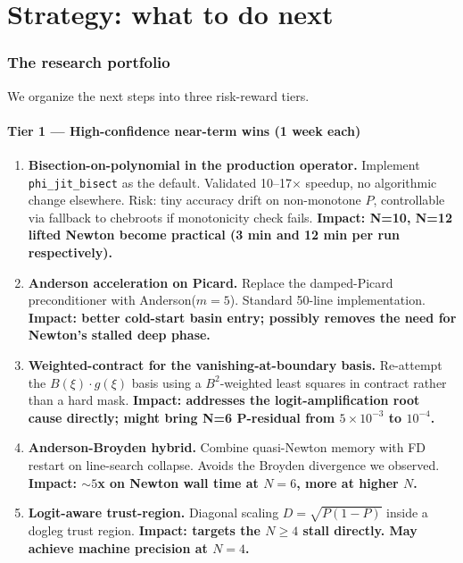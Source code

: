 \documentclass[11pt]{article}
\begin{document}
\newpage
\part{Strategy: what to do next}

\section{The research portfolio}\label{sec:roadmap}

We organize the next steps into three risk-reward tiers.

\subsection{Tier 1 — High-confidence near-term wins (1 week each)}

\begin{enumerate}
\item \textbf{Bisection-on-polynomial in the production operator.} Implement
\texttt{phi\_jit\_bisect} as the default. Validated 10--17$\times$ speedup, no algorithmic
change elsewhere. Risk: tiny accuracy drift on non-monotone $P$, controllable via
fallback to chebroots if monotonicity check fails. \textbf{Impact: N=10, N=12 lifted Newton
become practical (3 min and 12 min per run respectively).}
\item \textbf{Anderson acceleration on Picard.} Replace the damped-Picard preconditioner
with Anderson($m=5$). Standard 50-line implementation. \textbf{Impact: better cold-start
basin entry; possibly removes the need for Newton's stalled deep phase.}
\item \textbf{Weighted-contract for the vanishing-at-boundary basis.} Re-attempt the
$B(\xi)\cdot g(\xi)$ basis using a $B^2$-weighted least squares in contract rather than
a hard mask. \textbf{Impact: addresses the logit-amplification root cause directly; might
bring N=6 P-residual from $5\times 10^{-3}$ to $10^{-4}$.}
\item \textbf{Anderson-Broyden hybrid.} Combine quasi-Newton memory with FD restart on
line-search collapse. Avoids the Broyden divergence we observed. \textbf{Impact: $\sim 5$x
on Newton wall time at $N=6$, more at higher $N$.}
\item \textbf{Logit-aware trust-region.} Diagonal scaling $D = \sqrt{P(1-P)}$ inside a
dogleg trust region. \textbf{Impact: targets the $N\ge 4$ stall directly. May achieve
machine precision at $N=4$.}
\end{enumerate}
\end{document}
